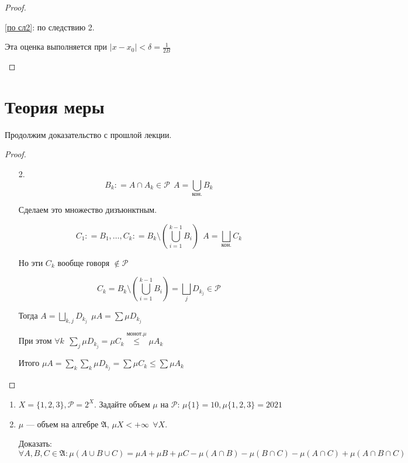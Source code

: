 \begin{proof}
\begin{enumerate}
\begin{enumerate}
                        \ref{по сл2}: по следствию 2.

                        Эта оценка выполняется при \(|x - x_0|< \delta = \frac{1}{2B}\)
              \end{enumerate}
    \end{enumerate}
\end{proof}

\section*{Теория меры}

Продолжим доказательство с прошлой лекции.

\begin{proof}
    \begin{enumerate}
        \item [2.]
              \[B_k : = A\cap A_k \in \mathcal{P}\ \ A = \bigcup_{\text{кон.}} B_k\]

              Сделаем это множество дизъюнктным.

              \[C_1 : = B_1, \dots , C_k : = B_k \setminus \left(\bigcup_{i = 1}^{k - 1} B_i\right)\ \ A = \bigsqcup_{\text{кон.}} C_k\]

              Но эти \(C_k\) вообще говоря \(\not\in \mathcal{P}\)

              \[C_k = B_k \setminus \left(\bigcup_{i = 1}^{k - 1} B_i\right) = \bigsqcup_j D_{k_j}\in \mathcal{P}\]

              Тогда \(A = \bigsqcup\limits_{k, j} D_{k_j}\ \ \mu A = \sum \mu D_{k_j}\)

              При этом \(\forall k \ \ \sum\limits_j \mu D_{k_j} = \mu C_k \stackrel{\text{монот.} \mu}{\le} \mu A_k\)

              Итого \(\mu A = \sum\limits_k \sum\limits_k \mu D_{k_j} = \sum \mu C_k \le \sum \mu A_k\)
    \end{enumerate}
\end{proof}

\begin{exercise}\itemfix
    \begin{enumerate}
        \item \(X = \{1,2,3\}, \mathcal{P} = 2^X\). Задайте объем \(\mu\) на \(\mathcal{P}\): \(\mu \{1\} = 10, \mu \{1,2,3\} = 2021\)
        \item \(\mu\) --- объем на алгебре \(\mathfrak{A}\), \(\mu X < +\infty \ \ \forall X\).

              Доказать: \(\forall A, B, C \in \mathfrak{A} : \mu(A\cup B\cup C) = \mu A + \mu B + \mu C - \mu(A\cap B) - \mu(B\cap C) - \mu(A\cap C) + \mu(A\cap B\cap C)\)
    \end{enumerate}
\end{exercise}

